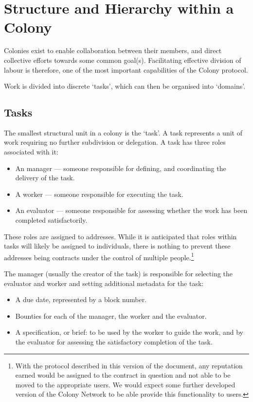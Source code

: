 \section{Structure and Hierarchy within a Colony}\label{sec:colony-structure}
Colonies exist to enable collaboration between their members, and direct collective efforts towards some common goal(s). Facilitating effective division of labour is therefore, one of the most important capabilities of the Colony protocol.

Work is divided into discrete `tasks', which can then be organised into `domains'.

\subsection{Tasks}\label{sec:tasks}

The smallest structural unit in a colony is the `task'. A task represents a unit of work requiring no further subdivision or delegation. A task has three roles associated with it:
\begin{itemize}
\item An manager --- someone responsible for defining, and coordinating the delivery of the task.
\item A worker --- someone responsible for executing the task.
\item An evaluator --- someone responsible for assessing whether the work has been completed satisfactorily.
\end{itemize}

These roles are assigned to addresses. While it is anticipated that roles within tasks will likely be assigned to individuals, there is nothing to prevent these addresses being contracts under the control of multiple people.\footnote{With the protocol described in this version of the document, any reputation earned would be assigned to the contract in question and not able to be moved to the appropriate users. We would expect some further developed version of the Colony Network to be able provide this functionality to users.}

The manager (usually the creator of the task) is responsible for selecting the evaluator and worker and setting additional metadata for the task:

\begin{itemize}
\item A due date, represented by a block number.
\item Bounties for each of the manager, the worker and the evaluator.
\item A specification, or brief: to be used by the worker to guide the work, and by the evaluator for assessing the satisfactory completion of the task.
\end{itemize}

